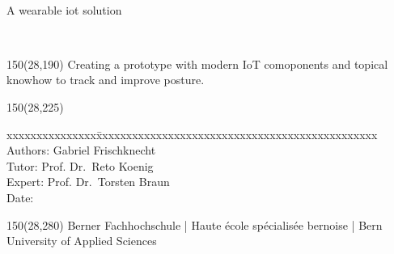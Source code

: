 \begin{titlepage}
\begin{flushleft}

\vspace*{115mm}

\fontsize{26pt}{28pt}\selectfont 
\heading				\\							%
\vspace{2mm}

\fontsize{16pt}{20pt}\selectfont\vspace{0.3em}
A wearable iot solution			\\				%
\vspace{5mm}

\fontsize{10pt}{12pt}\selectfont
\textbf{} \\		%
\vspace{3mm}

\begin{textblock}{150}(28,190)
\fontsize{10pt}{12pt}\selectfont
Creating a prototype with modern IoT comoponents and topical knowhow to track and improve posture.
\end{textblock}

\begin{textblock}{150}(28,225)
\fontsize{10pt}{17pt}\selectfont
\begin{tabbing}
xxxxxxxxxxxxxxx\=xxxxxxxxxxxxxxxxxxxxxxxxxxxxxxxxxxxxxxxxxxxxxxx \kill
Authors:		\> Gabriel Frischknecht		\\					%
Tutor:	\> Prof. Dr.~Reto Koenig		\\
Expert:	\> Prof. Dr.~Torsten Braun		\\%
Date:			\> \versiondate					\\							%
\end{tabbing}

\end{textblock}
\end{flushleft}

\begin{textblock}{150}(28,280)
\noindent 
\color{bfhgrey}\fontsize{9pt}{10pt}\selectfont
Berner Fachhochschule | Haute \'ecole sp\'ecialis\'ee bernoise | Bern University of Applied Sciences
\color{black}\selectfont
\end{textblock}


\end{titlepage}

%
%
